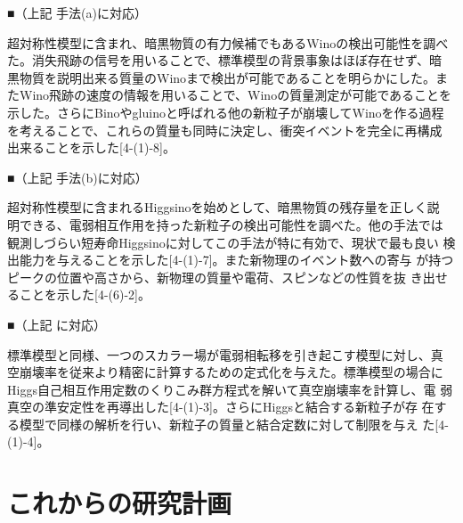 \documentclass[11pt,a4paper,twoside,dvipdfmx]{jarticle}		%
\newcommand{\研究課題名}{粒子加速器を用いた電弱相互作用を持つ新物理の探索}
\newcommand{\研究機関名}{東京大学}
\newcommand{\申請者氏名}{千草颯}
\newcommand{\研究代表者氏名}{\申請者氏名}
\newcommand{\研究期間の最終元号年度}{34}	%
\begin{document}
{\vspace*{1mm}

■（上記  手法(a)に対応）

超対称性模型に含まれ、暗黒物質の有力候補でもあるWinoの検出可能性を調べ
た。消失飛跡の信号を用いることで、標準模型の背景事象はほぼ存在せず、暗
黒物質を説明出来る質量のWinoまで検出が可能であることを明らかにした。ま
たWino飛跡の速度の情報を用いることで、Winoの質量測定が可能であることを
示した。さらにBinoやgluinoと呼ばれる他の新粒子が崩壊してWinoを作る過程
を考えることで、これらの質量も同時に決定し、衝突イベントを完全に再構成
出来ることを示した[4-(1)-8]。

\vspace*{1mm}

■（上記  手法(b)に対応）

超対称性模型に含まれるHiggsinoを始めとして、暗黒物質の残存量を正しく説
明できる、電弱相互作用を持った新粒子の検出可能性を調べた。他の手法では
観測しづらい短寿命Higgsinoに対してこの手法が特に有効で、現状で最も良い
検出能力を与えることを示した[4-(1)-7]。また新物理のイベント数への寄与
が持つピークの位置や高さから、新物理の質量や電荷、スピンなどの性質を抜
き出せることを示した[4-(6)-2]。

\vspace*{1mm}

■（上記  に対応）

標準模型と同様、一つのスカラー場が電弱相転移を引き起こす模型に対し、真
空崩壊率を従来より精密に計算するための定式化を与えた。標準模型の場合に
Higgs自己相互作用定数のくりこみ群方程式を解いて真空崩壊率を計算し、電
弱真空の準安定性を再導出した[4-(1)-3]。さらにHiggsと結合する新粒子が存
在する模型で同様の解析を行い、新粒子の質量と結合定数に対して制限を与え
た[4-(1)-4]。

\vspace*{1mm}


\vspace*{1mm}

}

\section{これからの研究計画}
\end{document}
